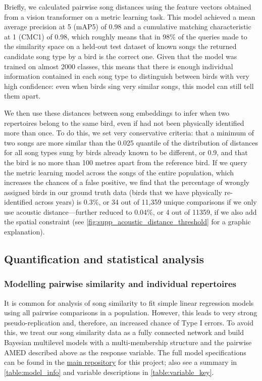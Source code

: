 \documentclass[9pt, onecolumn, twoside, lineno]{gsajnl}
\begin{document}
Briefly, we calculated pairwise song distances using the feature vectors obtained from a vision transformer on a metric learning task. This model achieved a mean average precision at 5 (mAP\@5) of 0.98 and a cumulative matching characteristic at 1 (CMC\@1) of 0.98, which roughly means that in 98\% of the queries made to the similarity space on a held-out test dataset of known songs the returned candidate song type by a bird is the correct one. Given that the model was trained on almost 2000 classes, this means that there is enough individual information contained in each song type to distinguish between birds with very high confidence: even when birds sing very similar songs, this model can still tell them apart.

We then use these distances between song embeddings to infer when two repertoires belong to the same bird, even if had not been physically identified more than once. To do this, we set very conservative criteria: that a minimum of two songs are more similar than the 0.025 quantile of the distribution of distances for all song types sung by birds already known to be different, or 0.9, and that the bird is no more than 100 metres apart from the reference bird. If we query the metric learning model across the songs of the entire population, which increases the chances of a false positive, we find that the percentage of wrongly assigned birds in our ground truth data (birds that we have physically re-identified across years) is 0.3\%, or 34 out of 11,359 unique comparisons if we only use acoustic distance---further reduced to 0.04\%, or 4 out of 11359, if we also add the spatial constraint (see \autoref{fig:supp_acoustic_distance_threshold} for a graphic explanation).

\subsection{Quantification and statistical analysis}

\subsubsection{Modelling pairwise similarity and individual repertoires}

It is common for analysis of song similarity to fit simple linear regression models using all pairwise comparisons in a population. However, this leads to very strong pseudo-replication and, therefore, an increased chance of Type I errors. To avoid this, we treat our song similarity data as a fully connected network and build Bayesian multilevel models with a multi-membership structure and the pairwise $\text{AMED}$ described above as the response variable. The full model specifications can be found in the \href{https://github.com/nilomr/birdsong-demography}{main repository} for this project; also see a summary in \autoref{table:model_info} and variable descriptions in \autoref{table:variable_key}.
\end{document}
